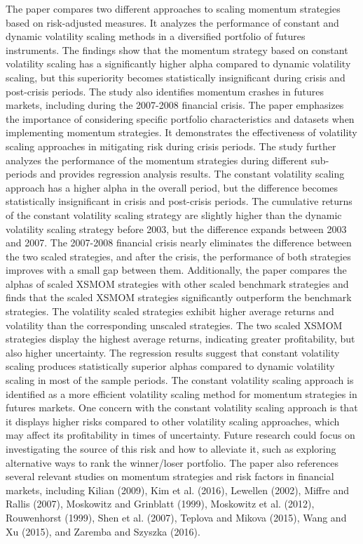 \documentclass{article}
\begin{document}
The paper compares two different approaches to scaling momentum strategies based on risk-adjusted measures. It analyzes the performance of constant and dynamic volatility scaling methods in a diversified portfolio of futures instruments. The findings show that the momentum strategy based on constant volatility scaling has a significantly higher alpha compared to dynamic volatility scaling, but this superiority becomes statistically insignificant during crisis and post-crisis periods. The study also identifies momentum crashes in futures markets, including during the 2007-2008 financial crisis. The paper emphasizes the importance of considering specific portfolio characteristics and datasets when implementing momentum strategies. It demonstrates the effectiveness of volatility scaling approaches in mitigating risk during crisis periods. The study further analyzes the performance of the momentum strategies during different sub-periods and provides regression analysis results. The constant volatility scaling approach has a higher alpha in the overall period, but the difference becomes statistically insignificant in crisis and post-crisis periods. The cumulative returns of the constant volatility scaling strategy are slightly higher than the dynamic volatility scaling strategy before 2003, but the difference expands between 2003 and 2007. The 2007-2008 financial crisis nearly eliminates the difference between the two scaled strategies, and after the crisis, the performance of both strategies improves with a small gap between them. Additionally, the paper compares the alphas of scaled XSMOM strategies with other scaled benchmark strategies and finds that the scaled XSMOM strategies significantly outperform the benchmark strategies. The volatility scaled strategies exhibit higher average returns and volatility than the corresponding unscaled strategies. The two scaled XSMOM strategies display the highest average returns, indicating greater profitability, but also higher uncertainty. The regression results suggest that constant volatility scaling produces statistically superior alphas compared to dynamic volatility scaling in most of the sample periods. The constant volatility scaling approach is identified as a more efficient volatility scaling method for momentum strategies in futures markets. One concern with the constant volatility scaling approach is that it displays higher risks compared to other volatility scaling approaches, which may affect its profitability in times of uncertainty. Future research could focus on investigating the source of this risk and how to alleviate it, such as exploring alternative ways to rank the winner/loser portfolio. The paper also references several relevant studies on momentum strategies and risk factors in financial markets, including Kilian (2009), Kim et al. (2016), Lewellen (2002), Miffre and Rallis (2007), Moskowitz and Grinblatt (1999), Moskowitz et al. (2012), Rouwenhorst (1999), Shen et al. (2007), Teplova and Mikova (2015), Wang and Xu (2015), and Zaremba and Szyszka (2016). 
\end{document}
